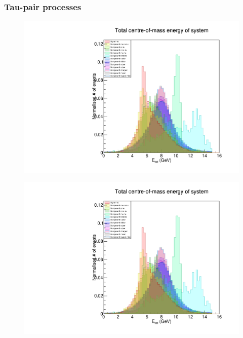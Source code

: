 \documentclass[12pt,a4paper]{article} %
\begin{document}
\subsubsection{Tau-pair processes}

\begin{figure}[h]
\centering
\begin{minipage}{.5\textwidth}
  \centering
  \includegraphics[width=\linewidth]{images/stack/stack_cut6_totalCM_E.pdf}
  \label{fig:test1}
\end{minipage}%
\begin{minipage}{.5\textwidth}
  \centering
  \includegraphics[width=\linewidth]{images/stack/stack_cut6_totalCM_E.pdf}
  \label{fig:test2}
\end{minipage}
\end{figure}
\end{document}
